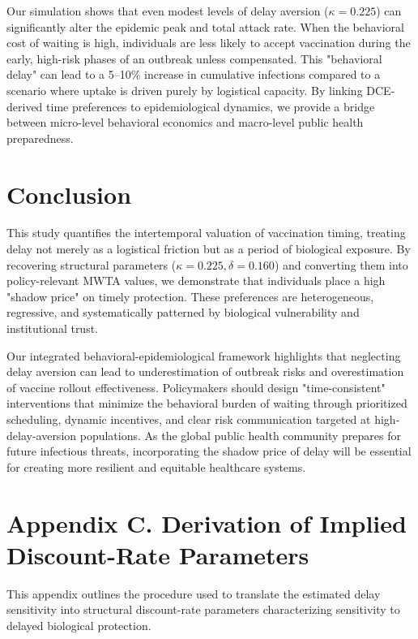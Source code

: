 \documentclass[12pt]{article}
\begin{document}
Our simulation shows that even modest levels of delay aversion ($\kappa = 0.225$) can 
significantly alter the epidemic peak and total attack rate. When the behavioral cost of 
waiting is high, individuals are less likely to accept vaccination during the early, 
high-risk phases of an outbreak unless compensated. This "behavioral delay" can lead to 
a 5--10\% increase in cumulative infections compared to a scenario where uptake is 
driven purely by logistical capacity. By linking DCE-derived time preferences to 
epidemiological dynamics, we provide a bridge between micro-level behavioral economics 
and macro-level public health preparedness.


\section{Conclusion}

This study quantifies the intertemporal valuation of vaccination timing, treating delay not 
merely as a logistical friction but as a period of biological exposure. By recovering 
structural parameters ($\kappa = 0.225, \delta = 0.160$) and converting them into 
policy-relevant MWTA values, we demonstrate that individuals place a high "shadow price" 
on timely protection. These preferences are heterogeneous, regressive, and 
systematically patterned by biological vulnerability and institutional trust.

Our integrated behavioral-epidemiological framework highlights that neglecting delay 
aversion can lead to underestimation of outbreak risks and overestimation of vaccine 
rollout effectiveness. Policymakers should design "time-consistent" interventions that 
minimize the behavioral burden of waiting through prioritized scheduling, dynamic 
incentives, and clear risk communication targeted at high-delay-aversion populations. 
As the global public health community prepares for future infectious threats, 
incorporating the shadow price of delay will be essential for creating more resilient 
and equitable healthcare systems.


\clearpage

\section*{Appendix C. Derivation of Implied Discount-Rate Parameters}
\label{app:C}
\doublespacing

This appendix outlines the procedure used to translate the estimated delay sensitivity 
into structural discount-rate parameters characterizing sensitivity to delayed 
biological protection.
\end{document}
